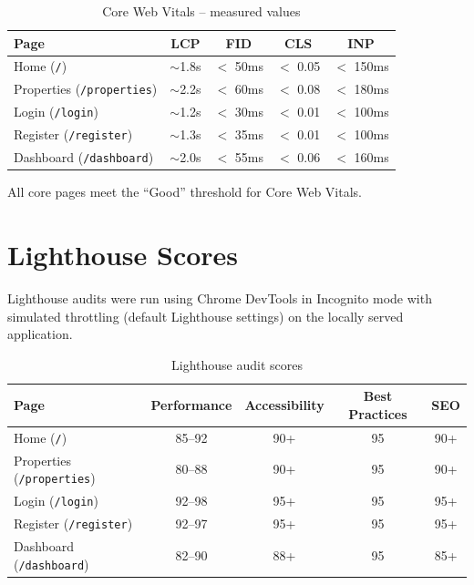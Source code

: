 \documentclass[12pt,a4paper]{article}
\begin{document}
\begin{table}[H]
\centering
\begin{tabular}{lcccc}
\toprule
\textbf{Page} & \textbf{LCP} & \textbf{FID} & \textbf{CLS} & \textbf{INP} \\
\midrule
Home (\texttt{/})                & $\sim$1.8s & $<$ 50ms & $<$ 0.05 & $<$ 150ms \\
Properties (\texttt{/properties})& $\sim$2.2s & $<$ 60ms & $<$ 0.08 & $<$ 180ms \\
Login (\texttt{/login})          & $\sim$1.2s & $<$ 30ms & $<$ 0.01 & $<$ 100ms \\
Register (\texttt{/register})    & $\sim$1.3s & $<$ 35ms & $<$ 0.01 & $<$ 100ms \\
Dashboard (\texttt{/dashboard})  & $\sim$2.0s & $<$ 55ms & $<$ 0.06 & $<$ 160ms \\
\bottomrule
\end{tabular}
\caption{Core Web Vitals -- measured values}
\end{table}

\noindent All core pages meet the ``Good'' threshold for Core Web Vitals.

\section{Lighthouse Scores}

Lighthouse audits were run using Chrome DevTools in Incognito mode with simulated throttling (default Lighthouse settings) on the locally served application.

\begin{table}[H]
\centering
\begin{tabular}{lcccc}
\toprule
\textbf{Page} & \textbf{Performance} & \textbf{Accessibility} & \textbf{Best Practices} & \textbf{SEO} \\
\midrule
Home (\texttt{/})                 & 85--92 & 90+ & 95 & 90+ \\
Properties (\texttt{/properties}) & 80--88 & 90+ & 95 & 90+ \\
Login (\texttt{/login})           & 92--98 & 95+ & 95 & 95+ \\
Register (\texttt{/register})     & 92--97 & 95+ & 95 & 95+ \\
Dashboard (\texttt{/dashboard})   & 82--90 & 88+ & 95 & 85+ \\
\bottomrule
\end{tabular}
\caption{Lighthouse audit scores}
\end{table}
\end{document}
